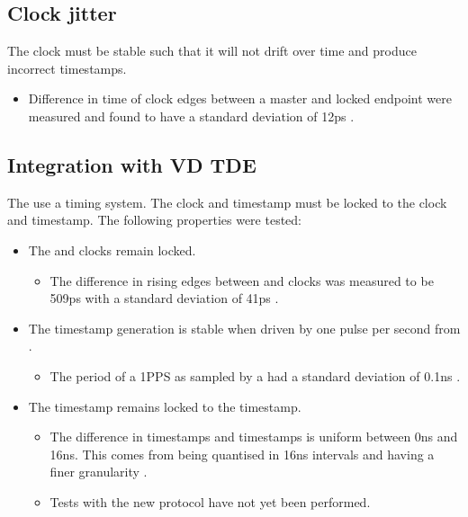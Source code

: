 \documentclass{dune}
\begin{document}
\subsection{Clock jitter}
\label{sec:jitter}
The clock must be stable such that it will not drift over time and produce incorrect timestamps.
\begin{itemize}
  \item Difference in time of clock edges between a master and locked endpoint were measured and found to have a standard deviation of 12ps \cite{jitter}.
\end{itemize}

\subsection{Integration with VD TDE}
The   use a  timing system.
The  clock and timestamp must be locked to the  clock and timestamp.
The following properties were tested:
\begin{itemize}
  \item The  and  clocks remain locked.
  \begin{itemize}
    \item The difference in rising edges between  and  clocks was measured to be 509ps with a standard deviation of 41ps \cite{wr}.
  \end{itemize}
  \item The  timestamp generation is stable when driven by one pulse per second from .
  \begin{itemize}
    \item The period of a 1PPS as sampled by a   had a standard deviation of 0.1ns \cite{wr}.
  \end{itemize}
  \item The  timestamp remains locked to the  timestamp.
  \begin{itemize}
    \item The difference in  timestamps and  timestamps is uniform between 0ns and 16ns. This comes from  being quantised in 16ns intervals and  having a finer granularity \cite{wr}.
    \item Tests with the new protocol have not yet been performed.
  \end{itemize}
\end{itemize}
\end{document}
